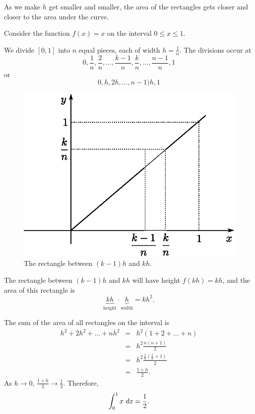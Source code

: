 As we make $h$ get smaller and smaller, the area of the rectangles gets closer and closer to the area under the curve.

\begin{example}
Consider the function $f(x)=x$ on the interval $0\le x\le 1$.

We divide $[0,1]$ into $n$ equal pieces, each of width $h=\frac{1}{n}$. The divisions occur at 
\[0,\frac{1}{n},\frac{2}{n},\dots,\frac{k-1}{n},\frac{k}{n},\dots,\frac{n-1}{n},1\]
or
\[0,h,2h,\dots,n-1)h,1\]

\begin{figure}[H]
\centering
\includegraphics[scale=0.8]{img/graph-x-integration}
\captionstyle{\centering\it}
\caption{The rectangle between $(k-1)h$ and $kh$.}
\end{figure}


The rectangle between $(k-1)h$ and $kh$ will have height $f(kh)=kh$, and the area of this rectangle is
\[\underbrace{kh}_{\text{height}}\cdot\underbrace{h}_{\text{width}}=kh^2.\]

The sum of the area of all rectangles on the interval is
\begin{eqnarray*}
h^2+2h^2+\dots+nh^2 &=& h^2(1+2+\dots+n) \\
&=& h^2\frac{n(n+1)}{2} \\
&=& h^2\frac{\frac{1}{h}(\frac{1}{h}+1)}{2} \\
&=& \frac{1+h}{2}.
\end{eqnarray*}
As $h\to0$, $\frac{1+h}{2}\to \frac{1}{2}$. Therefore, \[\int_0^1 x\ dx = \frac{1}{2}.\]
\end{example}

